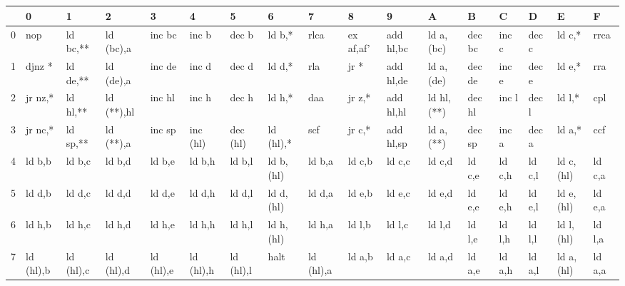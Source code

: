 \section{}

\renewcommand{\arraystretch}{1.9}
\setlength{\tabcolsep}{0.2em}
\subsection{}

\begin{ttfamily}
\begin{tiny}
\begin{tabularx}{1\textwidth}{l|X|X|X|X|X|X|X|X|X|X|X|X|X|X|X|X}
& 0           & 1         & 2          & 3          & 4 & 5 & 6 & 7 & 8 & 9 & A & B & C & D & E & F \\ \hline
0 & nop       & ld bc,**  & ld (bc),a  & inc bc     & inc b & dec b & ld b,* & rlca & ex af,af' & add hl,bc & ld a,(bc) & dec bc & inc c & dec c & ld c,* & rrca \\ \hline
1 & djnz *    & ld de,**  & ld (de),a  & inc de     & inc d & dec d & ld d,* & rla & jr * & add hl,de & ld a,(de) & dec de & inc e & dec e & ld e,* & rra \\ \hline
2 & jr nz,*   & ld hl,**  & ld (**),hl & inc hl     & inc h & dec h & ld h,* & daa & jr z,* & add hl,hl & ld hl,(**) & dec hl & inc l & dec l & ld l,* & cpl \\ \hline
3 & jr nc,*   & ld sp,**  & ld (**),a  & inc sp     & inc (hl) & dec (hl) & ld (hl),* & scf & jr c,* & add hl,sp & ld a,(**) & dec sp & inc a & dec a & ld a,* & ccf \\ \hline
4 & ld b,b    & ld b,c    & ld b,d     & ld b,e     & ld b,h & ld b,l & ld b,(hl) & ld b,a & ld c,b & ld c,c & ld c,d & ld c,e & ld c,h & ld c,l & ld c,(hl) & ld c,a \\ \hline
5 & ld d,b    & ld d,c    & ld d,d     & ld d,e     & ld d,h & ld d,l & ld d,(hl) & ld d,a & ld e,b & ld e,c & ld e,d & ld e,e & ld e,h & ld e,l & ld e,(hl) & ld e,a \\ \hline
6 & ld h,b    & ld h,c    & ld h,d     & ld h,e     & ld h,h & ld h,l & ld h,(hl) & ld h,a & ld l,b & ld l,c & ld l,d & ld l,e & ld l,h & ld l,l & ld l,(hl) & ld l,a \\ \hline
7 & ld (hl),b & ld (hl),c & ld (hl),d  & ld (hl),e  & ld (hl),h & ld (hl),l & halt & ld (hl),a & ld a,b & ld a,c & ld a,d & ld a,e & ld a,h & ld a,l & ld a,(hl) & ld a,a \\ \hline

\end{tabularx}
\end{tiny}
\end{ttfamily}

